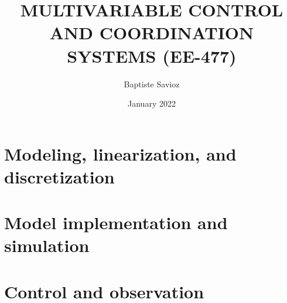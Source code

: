 \documentclass{article}
\title{MULTIVARIABLE CONTROL AND
COORDINATION SYSTEMS
(EE-477)
}
\author{Baptiste Savioz }
\date{January 2022}
\begin{document}
\label{page:titre}


\newpage
\tableofcontents
\newpage


\section{Modeling, linearization, and discretization}
\label{sec:modeling}


\newpage
\section{Model implementation and simulation}
\label{sec:implementation}


\newpage
\section{Control and observation}
\label{sec:control}




\newpage
\printbibliography 
\end{document}
